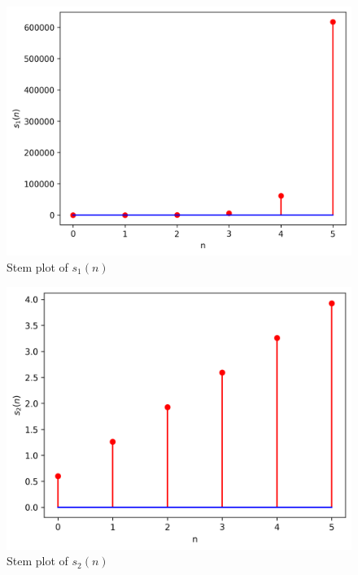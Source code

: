 \documentclass[journal,12pt,twocolumn]{IEEEtran}
\theoremstyle{remark}
\begin{document}
\begin{figure}[h!]
    \centering
    \includegraphics[width=\columnwidth]{figs/plot.png}
    \caption{Stem plot of $s_1(n)$}
    \label{fig:sr4}
\end{figure}
\begin{figure}[h!]
    \centering
    \includegraphics[width=\columnwidth]{figs/plot2.png}
    \caption{Stem plot of $s_2(n)$}
    \label{fig:sr7}
\end{figure}
\end{document}
